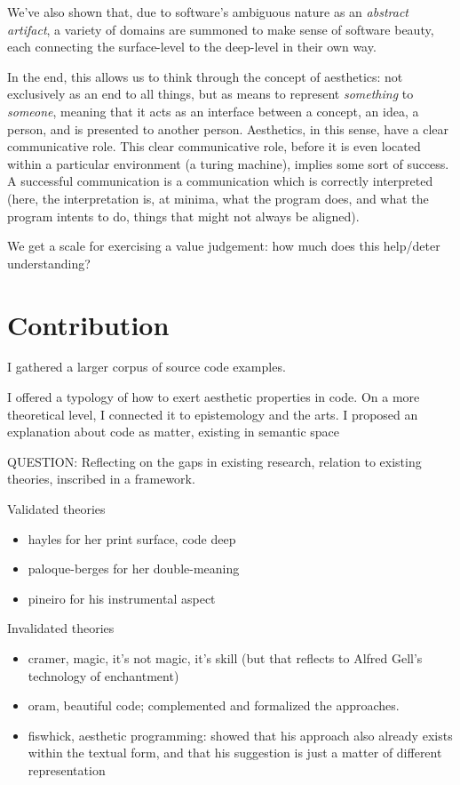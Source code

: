 We've also shown that, due to software's ambiguous nature as an \emph{abstract artifact}, a variety of domains are summoned to make sense of software beauty, each connecting the surface-level to the deep-level in their own way.

In the end, this allows us to think through the concept of aesthetics: not exclusively as an end to all things, but as means to represent \emph{something} to \emph{someone}, meaning that it acts as an interface between a concept, an idea, a person, and is presented to another person. Aesthetics, in this sense, have a clear communicative role. This clear communicative role, before it is even located within a particular environment (a turing machine), implies some sort of success. A successful communication is a communication which is correctly interpreted (here, the interpretation is, at minima, what the program does, and what the program intents to do, things that might not always be aligned).

We get a scale for exercising a value judgement: how much does this help/deter understanding?

\section{Contribution}  %

I gathered a larger corpus of source code examples.

I offered a typology of how to exert aesthetic properties in code.
On a more theoretical level, I connected it to epistemology and the arts.
I proposed an explanation about code as matter, existing in semantic space

QUESTION: Reflecting on the gaps in existing research, relation to existing theories, inscribed in a framework.

Validated theories
\begin{itemize}
    \item hayles for her print surface, code deep
    \item paloque-berges for her double-meaning
    \item pineiro for his instrumental aspect
\end{itemize}

Invalidated theories
\begin{itemize}
    \item cramer, magic, it's not magic, it's skill (but that reflects to Alfred Gell's technology of enchantment)
    \item oram, beautiful code; complemented and formalized the approaches.
    \item fiswhick, aesthetic programming: showed that his approach also already exists within the textual form, and that his suggestion is just a matter of different representation
\end{itemize}

